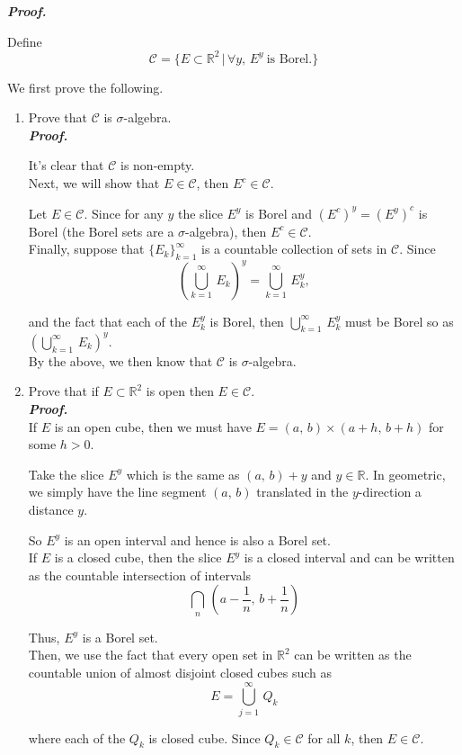 \documentclass[a4paper,11pt]{article}
\begin{document}
\textbf{\textit{Proof.}}

Define
	$$\mathcal{C}
	= \{E \subset \mathbb{R}^2\,|\,\forall y,\,E^y\ \text{is Borel.}\}$$

We first prove the following.

	\begin{enumerate}
		\item Prove that $\mathcal{C}$ is $\sigma$-algebra.\\

		\textbf{\textit{Proof.}}

		It's clear that $\mathcal{C}$ is non-empty.\\

		Next, we will show that $E \in \mathcal{C}$, then $E^c \in \mathcal{C}$.

		Let $E \in \mathcal{C}$. Since for any $y$ the slice $E^y$ is Borel and $(E^c)^y = (E^y)^c$ is Borel (the Borel sets are a $\sigma$-algebra), then $E^c \in \mathcal{C}$.\\

		Finally, suppose that $\{E_k\}_{k = 1}^\infty$ is a countable collection of sets in $\mathcal{C}$. Since
			$$\left(\bigcup_{k = 1}^\infty\,E_k\right)^y
			= \bigcup_{k = 1}^\infty\,E_k^y,$$

		and the fact that each of the $E_k^y$ is Borel, then $\bigcup_{k = 1}^\infty\,E_k^y$ must be Borel so as $\left(\bigcup_{k = 1}^\infty\,E_k\right)^y$.\\

		By the above, we then know that $\mathcal{C}$ is $\sigma$-algebra.\\

		\item Prove that if $E \subset \mathbb{R}^2$ is open then $E \in \mathcal{C}$.\\

		\textbf{\textit{Proof.}}\\

		If $E$ is an open cube, then we must have $E = (a,\,b) \times (a+h,\,b+h)$ for some $h > 0$.

		Take the slice $E^y$ which is the same as $(a,\,b) + y$ and $y \in \mathbb{R}$. In geometric, we simply have the line segment $(a,\,b)$ translated in the $y$-direction a distance $y$.

		So $E^y$ is an open interval and hence is also a Borel set.\\

		If $E$ is a closed cube, then the slice $E^y$ is a closed interval and can be written as the countable intersection of intervals
			$$\bigcap_n\,\left(a - \frac{1}{n},\,b + \frac{1}{n}\right)$$

		Thus, $E^y$ is a Borel set.\\

		Then, we use the fact that every open set in $\mathbb{R}^2$ can be written as the countable union of almost disjoint closed cubes such as
			$$E = \bigcup_{j = 1}^\infty\,Q_k$$

		where each of the $Q_k$ is closed cube. Since $Q_k \in \mathcal{C}$ for all $k$, then $E \in \mathcal{C}$.\\
	\end{enumerate}
\end{document}
